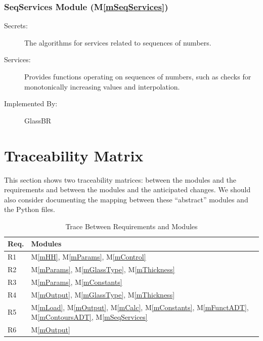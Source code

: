 \documentclass[12pt]{article}
\newcommand{\mref}[1]{M\ref{#1}}
\newcommand{\progname}{GlassBR}
\begin{document}
\subsubsection{SeqServices Module (\mref{mSeqServices})}

\begin{description}
\item[Secrets:] The algorithms for services related to sequences of numbers.
\item[Services:] Provides functions operating on sequences of numbers, such as
  checks for monotonically increasing values and interpolation.
\item[Implemented By:] \progname{}
\end{description}

\section{Traceability Matrix} \label{SecTM}

This section shows two traceability matrices: between the modules and the
requirements and between the modules and the anticipated changes.  We should
also consider documenting the mapping between these ``abstract'' modules and the
Python files.

\begin{table}[H]
\centering
\begin{tabular}{p{} p{}}
  \toprule
  \textbf{Req.} & \textbf{Modules}\\
  \midrule
  R1 & \mref{mHH}, \mref{mParams}, \mref{mControl}\\
  R2 & \mref{mParams}, \mref{mGlassType}, \mref{mThickness}\\
  R3 & \mref{mParams}, \mref{mConstants}\\
  R4 & \mref{mOutput}, \mref{mGlassType}, \mref{mThickness}\\
  R5 & \mref{mLoad}, \mref{mOutput}, \mref{mCalc}, \mref{mConstants}, \mref{mFunctADT},
       \mref{mContoursADT}, \mref{mSeqServices}\\
  R6 & \mref{mOutput}\\
  \bottomrule
\end{tabular}
\caption{Trace Between Requirements and Modules}
\label{TblRT}
\end{table}
\end{document}
